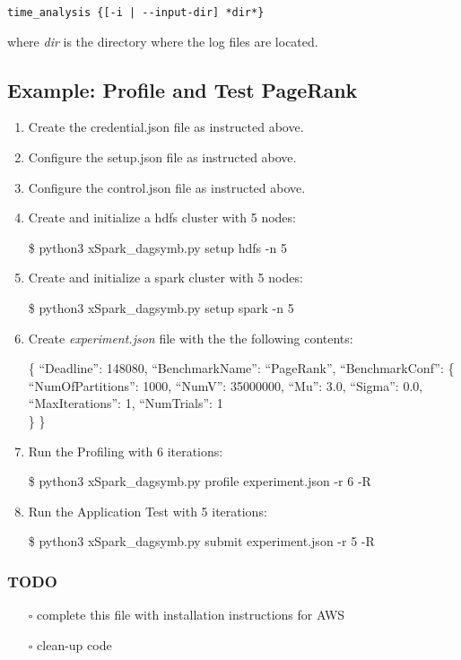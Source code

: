 \documentclass[
]{article}
\providecommand{\tightlist}{%
  \setlength{\itemsep}{0pt}\setlength{\parskip}{0pt}}
\begin{document}
\begin{verbatim}
time_analysis {[-i | --input-dir] *dir*}
\end{verbatim}

where \emph{dir} is the directory where the log files are located.

\hypertarget{example-profile-and-test-pagerank}{%
\subsection{Example: Profile and Test
PageRank}\label{example-profile-and-test-pagerank}}

\begin{enumerate}
\def\labelenumi{\arabic{enumi})}
\item
  Create the credential.json file as instructed above.
\item
  Configure the setup.json file as instructed above.
\item
  Configure the control.json file as instructed above.
\item
  Create and initialize a hdfs cluster with 5 nodes:

  \$ python3 xSpark\_dagsymb.py setup hdfs -n 5
\item
  Create and initialize a spark cluster with 5 nodes:

  \$ python3 xSpark\_dagsymb.py setup spark -n 5
\item
  Create \emph{experiment.json} file with the the following contents:

  \{ ``Deadline'': 148080, ``BenchmarkName'': ``PageRank'',
  ``BenchmarkConf'': \{ ``NumOfPartitions'': 1000, ``NumV'': 35000000,
  ``Mu'': 3.0, ``Sigma'': 0.0, ``MaxIterations'': 1, ``NumTrials'': 1\\
  \} \}
\item
  Run the Profiling with 6 iterations:

  \$ python3 xSpark\_dagsymb.py profile experiment.json -r 6 -R
\item
  Run the Application Test with 5 iterations:

  \$ python3 xSpark\_dagsymb.py submit experiment.json -r 5 -R
\end{enumerate}

\hypertarget{todo}{%
\subsubsection{TODO}\label{todo}}

\begin{itemize}
\tightlist
\item[$\square$]
  complete this file with installation instructions for AWS
\item[$\square$]
  clean-up code
\end{itemize}
\end{document}
